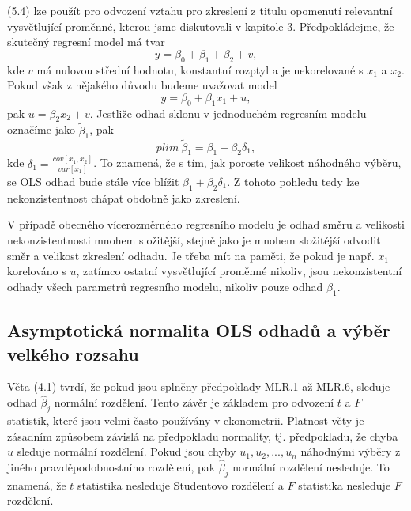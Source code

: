 (5.4) lze použít pro odvození vztahu pro zkreslení z titulu opomenutí relevantní vysvětlující proměnné, kterou jsme diskutovali v 
kapitole 3. Předpokládejme, že skutečný regresní model má tvar
\begin{equation}
y = \beta_0 + \beta_1 + \beta_2 + v,
\end{equation}
kde $v$ má nulovou střední hodnotu, konstantní rozptyl a je nekorelované s $x_1$ a $x_2$. Pokud však z nějakého důvodu budeme uvažovat model
\begin{equation}
y = \beta_0 + \beta_1 x_1 + u,
\end{equation}
pak $u = \beta_2 x_2 + v$. Jestliže odhad sklonu v jednoduchém regresním modelu označíme jako $\tilde{\beta}_1$, pak
\begin{equation}
plim ~ \tilde{\beta}_1 = \beta_1 + \beta_2 \delta_1,
\end{equation}
kde $\delta_1 = \frac{cov[x_1, x_2]}{var[x_1]}$. To znamená, že s tím, jak poroste velikost náhodného výběru, se OLS odhad bude stále více 
blížit $\beta_1 + \beta_2 \delta_1$. Z tohoto pohledu tedy lze nekonzistentnost chápat obdobně jako zkreslení.

V případě obecného vícerozměrného regresního modelu je odhad směru a velikosti nekonzistentnosti mnohem složitější, stejně jako je 
mnohem složitější odvodit směr a velikost zkreslení odhadu. Je třeba mít na paměti, že pokud je např. $x_1$ korelováno s $u$, zatímco 
ostatní vysvětlující proměnné nikoliv, jsou nekonzistentní odhady všech parametrů regresního modelu, nikoliv pouze odhad $\hat{\beta}_1$.

\subsection{Asymptotická normalita OLS odhadů a výběr velkého rozsahu}

Věta (4.1) tvrdí, že pokud jsou splněny předpoklady MLR.1 až MLR.6, sleduje odhad $\hat{\beta}_j$ normální rozdělení. Tento závěr je 
základem pro odvození $t$ a $F$ statistik, které jsou velmi často používány v ekonometrii. Platnost věty je zásadním způsobem závislá na 
předpokladu normality, tj. předpokladu, že chyba $u$ sleduje normální rozdělení. Pokud jsou chyby $u_1, u_2, ..., u_n$ náhodnými výběry z 
jiného pravděpodobnostního rozdělení, pak $\hat{\beta}_j$ normální rozdělení nesleduje. To znamená, že $t$ statistika nesleduje Studentovo 
rozdělení a $F$ statistika nesleduje $F$ rozdělení.

